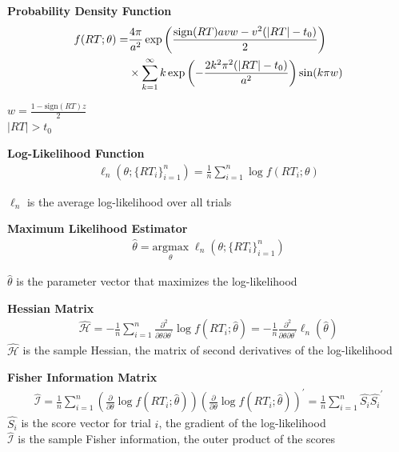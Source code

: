 \documentclass[8pt,aspectratio=169]{beamer}
\begin{document}
\begin{frame}{}
\textbf{Probability Density Function} \citep{feller_introduction_1968, navarro_fast_2009}
\begin{align}
    f(RT ; \theta) = &\frac{4\pi}{a^2}\exp\left(\frac{\text{sign}(RT)avw-v^2(|RT|-t_0)}{2}\right)\\
    &\times\sum_{k=1}^\infty k\exp\left(-\frac{2k^2\pi^2 (|RT|-t_0)}{a^2}\right)\sin(k\pi w)\notag
\end{align}

$w = \frac{1-\text{sign}(RT)z}{2}$\\
$|RT| > t_0$


\vfill
\textbf{Log-Likelihood Function}
\begin{align}
    \ell_n (\theta ; \{RT_i\}_{i=1}^n) = \frac{1}{n}\sum_{i=1}^n \log f(RT_i ; \theta)
\end{align}

$\ell_n$ is the average log-likelihood over all trials

\vfill
\textbf{Maximum Likelihood Estimator}
\begin{align}
    \hat{\theta} = \underset{\theta}{\text{argmax}}\;\ell_n (\theta ; \{RT_i\}_{i=1}^n)
\end{align}

$\hat{\theta}$ is the parameter vector that maximizes the log-likelihood

\end{frame}


\begin{frame}{}

\textbf{Hessian Matrix}
\begin{align}
        \widehat{\mathcal{H}} = -\frac{1}{n}\sum_{i=1}^n\frac{\partial^2}{\partial\theta\partial\theta^{\prime}}\log f(RT_i;\hat{\theta}) =-\frac{1}{n}\frac{\partial^2}{\partial\theta\partial\theta^{\prime}}\ell_n(\hat{\theta})
\end{align}
$\widehat{\mathcal{H}}$ is the sample Hessian, the matrix of second derivatives of the log-likelihood

\vfill
\textbf{Fisher Information Matrix}
\begin{align}
    \widehat{\mathscr{I}} = \frac{1}{n}\sum_{i=1}^n\left(\frac{\partial}{\partial\theta}\log f(RT_i;\hat{\theta})\right)\left(\frac{\partial}{\partial\theta}\log f(RT_i;\hat{\theta})\right)^{\prime} = \frac{1}{n} \sum_{i=1}^n \hat{S_i} \hat{S_i}^\prime
\end{align}
$\hat{S_i}$ is the score vector for trial $i$, the gradient of the log-likelihood\\
$\widehat{\mathscr{I}}$ is the sample Fisher information, the outer product of the scores

\end{frame}
\end{document}
